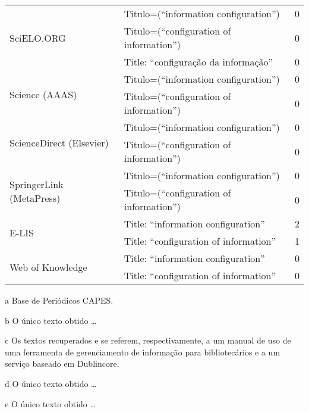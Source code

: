 \begin{center}
{\begin{ThreePartTable}
\begin{longtable}{p{7.2cm}|p{6.3cm}|p{1.8cm}}
	\multirow{3}{*}{SciELO.ORG}\tnote{a}
	& Titulo=(``information configuration'')
	& 0
	\\
	& Titulo=(``configuration of information'')
	& 0
	\\
	& Title: ``configuração da informação''
	& 0
	\\ \hline	

	\multirow{2}{*}{Science (AAAS)}\tnote{a}
	& Titulo=(``information configuration'')
	& 0
	\\
	& Titulo=(``configuration of information'')
	& 0
	\\ \hline	

	\multirow{2}{*}{ScienceDirect (Elsevier)}\tnote{a}
	& Titulo=(``information configuration'')
	& 0
	\\
	& Titulo=(``configuration of information'')
	& 0
	\\ \hline	

	\multirow{2}{*}{SpringerLink (MetaPress)}\tnote{a}
	& Titulo=(``information configuration'')
	& 0
	\\
	& Titulo=(``configuration of information'')
	& 0
	\\ \hline	

	\multirow{2}{*}{E-LIS}
	& Title: ``information configuration''
	& 2\tnote{c}
	\\
	& Title: ``configuration of information''
	& 1\tnote{d}
	\\ \hline	

	\multirow{2}{*}{Web of Knowledge}
	& Title: ``information configuration''
	& 0
	\\
	& Title: ``configuration of information''
	& 0
	\\ \hline	
	
\end{longtable}

	\begin{tablenotes}
		\item [a] Base de Periódicos CAPES.
		\item [b] O único texto obtido \ldots
		\item [c] Os textos recuperados \cite{hammer2005} e \cite{apps2001} se
		referem, respectivamente, a um manual de uso de uma ferramenta de
		gerenciamento de informação para bibliotecários e a um serviço baseado em Dublincore.
		\item [d] O único texto obtido \ldots
		\item [e] O único texto obtido \ldots

	\end{tablenotes}
	
\end{ThreePartTable}
}
\end{center}